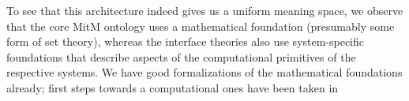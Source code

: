 To see that this architecture indeed gives us a uniform meaning space, we observe that the
core MitM ontology uses a mathematical foundation (presumably some form of set theory),
whereas the interface theories also use system-specific foundations that describe aspects
of the computational primitives of the respective systems. We have good formalizations of
the mathematical foundations already; first steps towards a computational ones have been
taken in~\cite{KohManRab:aumftg13}



